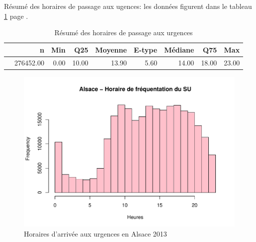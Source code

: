 \documentclass[12pt,english,french,twoside]{report}\usepackage[]{graphicx}\usepackage[]{color}
\makeatletter
\def\maxwidth{ %
  \ifdim\Gin@nat@width>\linewidth
    \linewidth
  \else
    \Gin@nat@width
  \fi
}
\newenvironment{knitrout}{}{} %
\makeatother
\begin{document}
Résumé des horaires de passage aux ugences: les données figurent dans le tableau \ref{tab:24} page \pageref{tab:24}.
\begin{table}[ht]
\centering
\begin{tabular}{rrrrrrrrr}
  \hline
 & n & Min & Q25 & Moyenne & E-type & Médiane & Q75 & Max \\ 
  \hline
 & 276452.00 & 0.00 & 10.00 & 13.90 & 5.60 & 14.00 & 18.00 & 23.00 \\ 
   \hline
\end{tabular}
\caption[horaires de passage]{Résumé des horaires de passage aux urgences} 
\label{tab:24}
\end{table}





\begin{figure}
\begin{center}
\begin{knitrout}
\color{fgcolor}
\includegraphics[width=\maxwidth]{figure/test23} 

\end{knitrout}

\end{center}
\caption{Horaires d'arrivée aux urgences en Alsace 2013}
\label{passage:als}
\end{figure}
\end{document}

